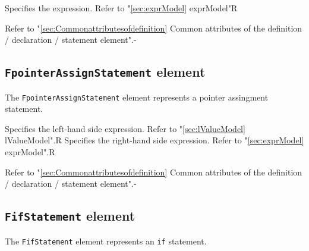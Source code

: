 \begin{XcodeMLChildElements}
{Specifies the expression. Refer to "\ref{sec:exprModel} exprModel"}{R}
\end{XcodeMLChildElements}

\begin{XcodeMLAttributes}
{Refer to "\ref{sec:Commonattributesofdefinition} Common attributes of the definition / declaration / statement element".}{-}
\end{XcodeMLAttributes}


\subsection{ {\tt FpointerAssignStatement} element}

The {\tt FpointerAssignStatement} element represents a pointer assingment statement.


\begin{XcodeMLChildElements}
{Specifies the left-hand side expression. Refer to "\ref{sec:lValueModel} lValueModel".}{R}
{Specifies the right-hand side expression. Refer to "\ref{sec:exprModel} exprModel".}{R}
\end{XcodeMLChildElements}

\begin{XcodeMLAttributes}
{Refer to "\ref{sec:Commonattributesofdefinition} Common attributes of the definition / declaration / statement element".}{-}
\end{XcodeMLAttributes}


\subsection{ {\tt FifStatement} element}

The {\tt FifStatement} element represents an {\tt if} statement.


